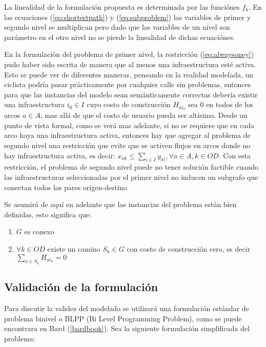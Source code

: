 \documentclass{article}
\begin{document}
  La linealidad de la formulación propuesta es determinada por las funciónes $f_k$. En las ecuaciones (\ref{eq:shortestpath}) y (\ref{eq:subproblem}) las variables de primer y segundo nivel se multiplican pero dado que las variables de un nivel son parámetro en el otro nivel no se pierde la linealidad de dichas ecuaciónes.

  En la formulación del problema de primer nivel, la restricción (\ref{eq:alwaysoney}) pudo haber sido escrita de manera que al menos una infraestructura esté activa. Esto se puede ver de diferentes maneras, pensando en la realidad modelada, un ciclista podría pasar prácticamente por cualquier calle sin problemas, entonces para que las instancias del modelo sean semánticamente correctas debería existir una infraestructura $i_0 \in I$ cuyo costo de construcción $H_{ai_0}$ sea 0 en todos de los arcos $a \in A$, mas allá de que el costo de usuario pueda ser altísimo. Desde un punto de vista formal, como se verá mas adelante, si no se requiere que en cada arco haya una infraestructura activa, entonces hay que agregar al problema de segundo nivel una restricción que evite que se activen flujos en arcos donde no hay infraestructura activa, es decir: $x_{ak} \leq \sum_{i \in I} y_{ai}, \forall a \in A, k \in OD$. Con esta restricción, el problema de segundo nivel puede no tener solución factible cuando las infraestructuras seleccionadas por el primer nivel no inducen un subgrafo que conectan todos los pares origen-destino.

  Se asumirá de aquí en adelante que las instancias del problema están bien definidas, esto significa que:

  \begin{enumerate}
    \item {$G$ es conexo}
    \item {$\forall k \in OD$ existe un camino $S_k \in G$ con costo de construcción cero, es decir $\sum_{a \in S_k} H_{ai_0} = 0$}
  \end{enumerate}

  \subsection*{Validación de la formulación}

  Para discutir la validez del modelado se utilizará una formulación estándar de problema binivel o BLPP (Bi Level Programming Problem), como se puede encontrara en Bard (\ref{bardbook}).
  Sea la siguiente formulación simplificada del problema:
\end{document}
